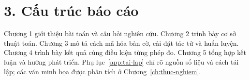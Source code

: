 \section*{3. Cấu trúc báo cáo}
Chương 1 giới thiệu bài toán và câu hỏi nghiên cứu. Chương 2 trình bày cơ sở thuật toán. Chương 3 mô tả cách mã hóa bàn cờ, cài đặt tác tử và huấn luyện. Chương 4 trình bày kết quả cùng điều kiện từng phép đo. Chương 5 tổng hợp kết luận và hướng phát triển. Phụ lục~\ref{app:tai-lap} chỉ rõ nguồn số liệu và cách tái lập; các ván minh họa được phân tích ở Chương~\ref{ch:thuc-nghiem}.
